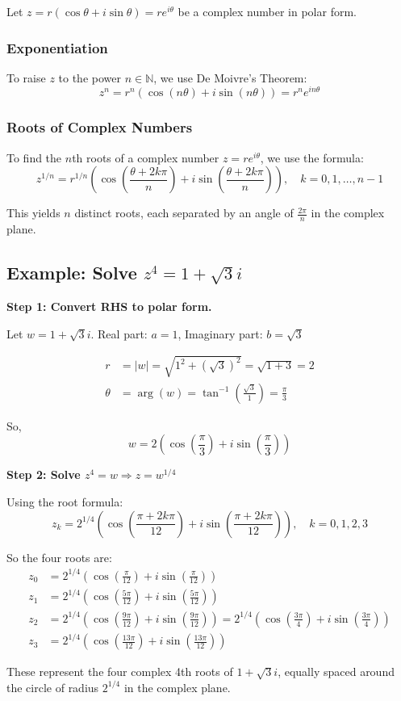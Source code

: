 Let \( z = r(\cos \theta + i \sin \theta) = re^{i\theta} \) be a complex number in polar form.

\subsubsection*{Exponentiation}

To raise \( z \) to the power \( n \in \mathbb{N} \), we use De Moivre’s Theorem:
\[
z^n = r^n (\cos(n\theta) + i \sin(n\theta)) = r^n e^{in\theta}
\]

\subsubsection*{Roots of Complex Numbers}

To find the \( n \)th roots of a complex number \( z = r e^{i\theta} \), we use the formula:
\[
z^{1/n} = r^{1/n} \left( \cos\left( \frac{\theta + 2k\pi}{n} \right) + i \sin\left( \frac{\theta + 2k\pi}{n} \right) \right), \quad k = 0, 1, \ldots, n-1
\]

This yields \( n \) distinct roots, each separated by an angle of \( \frac{2\pi}{n} \) in the complex plane.

\subsection*{Example: Solve \( z^4 = 1 + \sqrt{3}i \)}

\textbf{Step 1: Convert RHS to polar form.}

Let \( w = 1 + \sqrt{3}i \).  
Real part: \( a = 1 \), Imaginary part: \( b = \sqrt{3} \)

\begin{align*}
r &= |w| = \sqrt{1^2 + (\sqrt{3})^2} = \sqrt{1 + 3} = 2 \\
\theta &= \arg(w) = \tan^{-1} \left( \frac{\sqrt{3}}{1} \right) = \frac{\pi}{3}
\end{align*}

So,
\[
w = 2 \left( \cos\left( \frac{\pi}{3} \right) + i \sin\left( \frac{\pi}{3} \right) \right)
\]

\textbf{Step 2: Solve \( z^4 = w \Rightarrow z = w^{1/4} \)}

Using the root formula:
\[
z_k = 2^{1/4} \left( \cos\left( \frac{\pi + 2k\pi}{12} \right) + i \sin\left( \frac{\pi + 2k\pi}{12} \right) \right), \quad k = 0, 1, 2, 3
\]

So the four roots are:
\begin{align*}
z_0 &= 2^{1/4} \left( \cos\left( \frac{\pi}{12} \right) + i \sin\left( \frac{\pi}{12} \right) \right) \\
z_1 &= 2^{1/4} \left( \cos\left( \frac{5\pi}{12} \right) + i \sin\left( \frac{5\pi}{12} \right) \right) \\
z_2 &= 2^{1/4} \left( \cos\left( \frac{9\pi}{12} \right) + i \sin\left( \frac{9\pi}{12} \right) \right) = 2^{1/4} \left( \cos\left( \frac{3\pi}{4} \right) + i \sin\left( \frac{3\pi}{4} \right) \right) \\
z_3 &= 2^{1/4} \left( \cos\left( \frac{13\pi}{12} \right) + i \sin\left( \frac{13\pi}{12} \right) \right)
\end{align*}

These represent the four complex 4th roots of \( 1 + \sqrt{3}i \), equally spaced around the circle of radius \( 2^{1/4} \) in the complex plane.